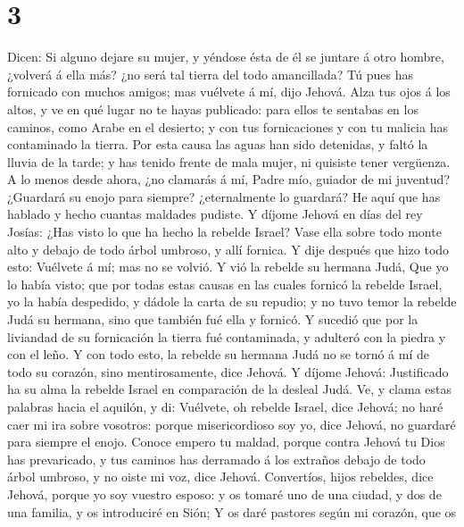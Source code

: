 \hypertarget{section-2}{%
\section{3}\label{section-2}}

 Dicen: Si alguno dejare su mujer, y yéndose ésta de él se
juntare á otro hombre, ¿volverá á ella más? ¿no será tal tierra del todo
amancillada? Tú pues has fornicado con muchos amigos; mas vuélvete á mí,
dijo Jehová.  Alza tus ojos á los altos, y ve en qué lugar
no te hayas publicado: para ellos te sentabas en los caminos, como Arabe
en el desierto; y con tus fornicaciones y con tu malicia has contaminado
la tierra.  Por esta causa las aguas han sido detenidas, y
faltó la lluvia de la tarde; y has tenido frente de mala mujer, ni
quisiste tener vergüenza.  A lo menos desde ahora, ¿no
clamarás á mí, Padre mío, guiador de mi juventud? 
¿Guardará su enojo para siempre? ¿eternalmente lo guardará? He aquí que
has hablado y hecho cuantas maldades pudiste.  Y díjome
Jehová en días del rey Josías: ¿Has visto lo que ha hecho la rebelde
Israel? Vase ella sobre todo monte alto y debajo de todo árbol umbroso,
y allí fornica.  Y dije después que hizo todo esto:
Vuélvete á mí; mas no se volvió. Y vió la rebelde su hermana Judá,
 Que yo lo había visto; que por todas estas causas en las
cuales fornicó la rebelde Israel, yo la había despedido, y dádole la
carta de su repudio; y no tuvo temor la rebelde Judá su hermana, sino
que también fué ella y fornicó.  Y sucedió que por la
liviandad de su fornicación la tierra fué contaminada, y adulteró con la
piedra y con el leño.  Y con todo esto, la rebelde su
hermana Judá no se tornó á mí de todo su corazón, sino mentirosamente,
dice Jehová.  Y díjome Jehová: Justificado ha su alma la
rebelde Israel en comparación de la desleal Judá.  Ve, y
clama estas palabras hacia el aquilón, y di: Vuélvete, oh rebelde
Israel, dice Jehová; no haré caer mi ira sobre vosotros: porque
misericordioso soy yo, dice Jehová, no guardaré para siempre el enojo.
 Conoce empero tu maldad, porque contra Jehová tu Dios
has prevaricado, y tus caminos has derramado á los extraños debajo de
todo árbol umbroso, y no oiste mi voz, dice Jehová. 
Convertíos, hijos rebeldes, dice Jehová, porque yo soy vuestro esposo: y
os tomaré uno de una ciudad, y dos de una familia, y os introduciré en
Sión;  Y os daré pastores según mi corazón, que os
